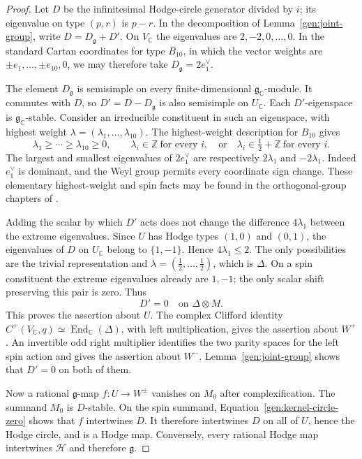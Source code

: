 \begin{proof}
Let $D$ be the infinitesimal Hodge-circle generator divided by $i$;
its eigenvalue on type $(p,r)$ is $p-r$.  In the decomposition of
Lemma~\ref{gen:joint-group}, write $D=D_{\mathfrak g}+D'$.  On
$V_{\mathbb C}$ the eigenvalues are $2,-2,0,\ldots,0$.
In the standard Cartan coordinates for type $B_{10}$, in which the
vector weights are $\pm e_1,\ldots,\pm e_{10},0$, we may therefore take
$D_{\mathfrak g}=2e_1^\vee$.

The element $D_{\mathfrak g}$ is semisimple on every finite-dimensional
$\mathfrak g_{\mathbb C}$-module.  It commutes with $D$, so
$D'=D-D_{\mathfrak g}$ is also semisimple on $U_{\mathbb C}$.
Each $D'$-eigenspace is $\mathfrak g_{\mathbb C}$-stable.
Consider an irreducible constituent in such an eigenspace, with
highest weight $\lambda=(\lambda_1,\ldots,\lambda_{10})$.
The highest-weight description for $B_{10}$ gives
\[
 \lambda_1\ge\cdots\ge\lambda_{10}\ge0,
 \qquad
 \lambda_i\in\mathbb Z\ \text{for every }i,
 \quad\text{or}\quad
 \lambda_i\in\tfrac12+\mathbb Z\ \text{for every }i.
\]
The largest and smallest eigenvalues of $2e_1^\vee$ are respectively
$2\lambda_1$ and $-2\lambda_1$.  Indeed $e_1^\vee$ is dominant, and the
Weyl group permits every coordinate sign change.  These elementary
highest-weight and spin facts may be found in the orthogonal-group
chapters of \cite{FultonHarris}.

Adding the scalar by which $D'$ acts does not change the difference
$4\lambda_1$ between the extreme eigenvalues.  Since $U$ has Hodge
types $(1,0)$ and $(0,1)$, the eigenvalues of $D$ on $U_{\mathbb C}$
belong to $\{1,-1\}$.  Hence $4\lambda_1\le2$.  The only possibilities
are the trivial representation and
$\lambda=(\tfrac12,\ldots,\tfrac12)$, which is $\Delta$.
On a spin constituent the extreme eigenvalues already are $1,-1$;
the only scalar shift preserving this pair is zero.  Thus
\begin{equation}\label{gen:kernel-circle-zero}
 D'=0\quad\text{on }\Delta\otimes M.
\end{equation}
This proves the assertion about $U$.  The complex Clifford identity
$C^+(V_{\mathbb C},q)\simeq\operatorname{End}_{\mathbb C}(\Delta)$,
with left multiplication, gives the assertion about $W^+$.
An invertible odd right multiplier identifies the two parity spaces
for the left spin action and gives the assertion about $W^-$.
Lemma~\ref{gen:joint-group} shows that $D'=0$ on both of them.

Now a rational $\mathfrak g$-map $f:U\to W^\pm$ vanishes on $M_0$
after complexification.  The summand $M_0$ is $D$-stable.  On the spin
summand, Equation~\eqref{gen:kernel-circle-zero} shows that $f$
intertwines $D$.  It therefore intertwines $D$ on all of $U$, hence
the Hodge circle, and is a Hodge map.  Conversely, every rational
Hodge map intertwines $\mathcal H$ and therefore $\mathfrak g$.


\end{proof}
